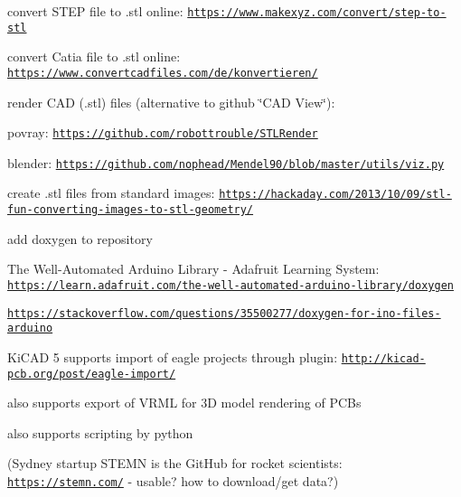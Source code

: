 \begin{DoxyItemize}
\item convert S\-T\-E\-P file to .stl online\-: \href{https://www.makexyz.com/convert/step-to-stl}{\tt https\-://www.\-makexyz.\-com/convert/step-\/to-\/stl}
\item convert Catia file to .stl online\-: \href{https://www.convertcadfiles.com/de/konvertieren/}{\tt https\-://www.\-convertcadfiles.\-com/de/konvertieren/}
\item render C\-A\-D (.stl) files (alternative to github \char`\"{}\-C\-A\-D View\char`\"{})\-:
\begin{DoxyItemize}
\item povray\-: \href{https://github.com/robottrouble/STLRender}{\tt https\-://github.\-com/robottrouble/\-S\-T\-L\-Render}
\item blender\-: \href{https://github.com/nophead/Mendel90/blob/master/utils/viz.py}{\tt https\-://github.\-com/nophead/\-Mendel90/blob/master/utils/viz.\-py}
\end{DoxyItemize}
\item create .stl files from standard images\-: \href{https://hackaday.com/2013/10/09/stl-fun-converting-images-to-stl-geometry/}{\tt https\-://hackaday.\-com/2013/10/09/stl-\/fun-\/converting-\/images-\/to-\/stl-\/geometry/}
\item add doxygen to repository
\begin{DoxyItemize}
\item The Well-\/\-Automated Arduino Library -\/ Adafruit Learning System\-: \href{https://learn.adafruit.com/the-well-automated-arduino-library/doxygen}{\tt https\-://learn.\-adafruit.\-com/the-\/well-\/automated-\/arduino-\/library/doxygen}
\item \href{https://stackoverflow.com/questions/35500277/doxygen-for-ino-files-arduino}{\tt https\-://stackoverflow.\-com/questions/35500277/doxygen-\/for-\/ino-\/files-\/arduino}
\end{DoxyItemize}
\item Ki\-C\-A\-D 5 supports import of eagle projects through plugin\-: \href{http://kicad-pcb.org/post/eagle-import/}{\tt http\-://kicad-\/pcb.\-org/post/eagle-\/import/}
\begin{DoxyItemize}
\item also supports export of V\-R\-M\-L for 3\-D model rendering of P\-C\-Bs
\item also supports scripting by python
\end{DoxyItemize}
\item (Sydney startup S\-T\-E\-M\-N is the Git\-Hub for rocket scientists\-: \href{https://stemn.com/}{\tt https\-://stemn.\-com/} -\/ usable? how to download/get data?)
\end{DoxyItemize}

